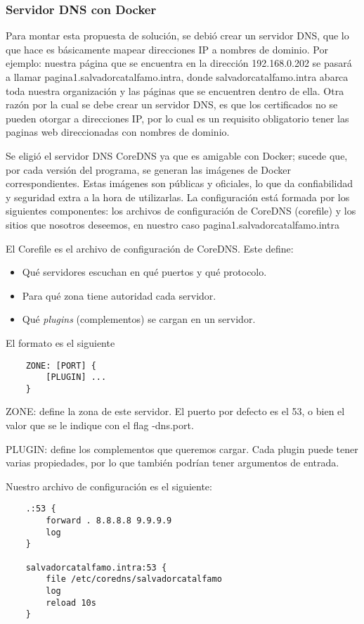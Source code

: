 \subsubsection*{Servidor DNS con Docker}

Para montar esta propuesta de solución, se debió crear un servidor DNS, que lo que hace
es básicamente mapear direcciones IP a nombres de dominio. Por ejemplo: nuestra página que 
se encuentra en la dirección 192.168.0.202 se pasará a llamar pagina1.salvadorcatalfamo.intra, 
donde salvadorcatalfamo.intra abarca toda nuestra organización y las páginas que se encuentren
dentro de ella. Otra razón por la cual se debe 
crear un servidor DNS, es que los certificados no se pueden otorgar a direcciones IP, por lo 
cual es un requisito obligatorio tener las paginas web direccionadas con nombres de dominio.

Se eligió el servidor DNS CoreDNS ya que es amigable con Docker; sucede que, por cada versión del 
programa, se generan las imágenes de Docker correspondientes. Estas imágenes son públicas y oficiales, 
lo que da confiabilidad y seguridad extra a la hora de utilizarlas. La configuración está formada por 
los siguientes componentes: los archivos de configuración de CoreDNS (corefile) y los sitios que 
nosotros deseemos, en nuestro caso pagina1.salvadorcatalfamo.intra

\noindent El Corefile es el archivo de configuración de CoreDNS. Este define:
\begin{itemize}
    \setlength\itemsep{-0.6em}
    \item Qué servidores escuchan en qué puertos y qué protocolo.
    \item Para qué zona tiene autoridad cada servidor.
    \item Qué \emph{plugins} (complementos) se cargan en un servidor.
\end{itemize}

\noindent El formato es el siguiente
\begin{verbatim}
    ZONE: [PORT] {
        [PLUGIN] ...
    }
\end{verbatim}

\noindent ZONE: define la zona de este servidor. El puerto por defecto es el 53, o bien el valor que se le indique 
con el flag -dns.port.

\noindent PLUGIN: define los complementos que queremos cargar. Cada plugin puede tener varias propiedades, por 
lo que también podrían tener argumentos de entrada.

\noindent Nuestro archivo de configuración es el siguiente:
\begin{verbatim}
    .:53 {
        forward . 8.8.8.8 9.9.9.9
        log
    }

    salvadorcatalfamo.intra:53 {
        file /etc/coredns/salvadorcatalfamo
        log
        reload 10s
    }    
\end{verbatim}

